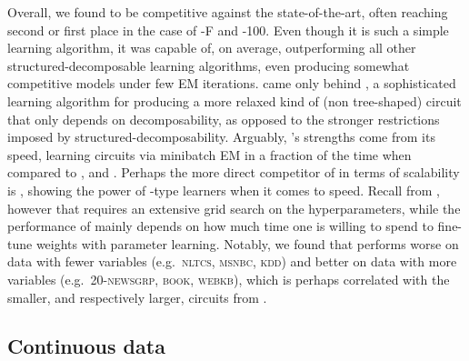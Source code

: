 Overall, we found  to be competitive against the state-of-the-art, often
reaching second or first place in the case of -F and -100. Even
though it is such a simple learning algorithm, it was capable of, on average, outperforming all
other structured-decomposable learning algorithms, even producing somewhat competitive models under
few EM iterations.  came only behind , a sophisticated
learning algorithm for producing a more relaxed kind of (non tree-shaped) circuit that only depends
on decomposability, as opposed to the stronger restrictions imposed by structured-decomposability.
Arguably, 's strengths come from its speed, learning circuits via minibatch EM in
a fraction of the time when compared to ,  and
. Perhaps the more direct competitor of  in terms of
scalability is , showing the power of \randclass{}-type learners when it comes to
speed. Recall from , however that  requires an extensive grid search
on the hyperparameters, while the performance of  mainly depends on how much time
one is willing to spend to fine-tune weights with parameter learning. Notably, we found that
 performs worse on data with fewer variables (e.g.\ \textsc{nltcs},
\textsc{msnbc}, \textsc{kdd}) and better on data with more variables (e.g.\ \textsc{20-newsgrp},
\textsc{book}, \textsc{webkb}), which is perhaps correlated with the smaller, and respectively
larger, circuits from .

\subsection{Continuous data}
\label{sec:continuous}

